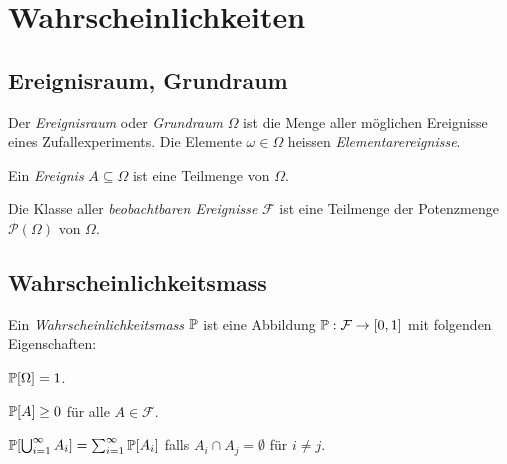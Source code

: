 
\section{Wahrscheinlichkeiten}


\subsection{Ereignisraum, Grundraum}

\begin{definition}[Ereignisraum]
	Der \emph{Ereignisraum} oder \emph{Grundraum} \(\Omega\) ist die Menge aller möglichen Ereignisse eines Zufallexperiments. Die Elemente \(\omega \in \Omega\) heissen \emph{Elementarereignisse}.
\end{definition}

\begin{definition}[Ereignis]
	Ein \emph{Ereignis} \(A \subseteq \Omega\) ist eine Teilmenge von \(\Omega\).
\end{definition}

Die Klasse aller \emph{beobachtbaren Ereignisse} \(\mathcal{F}\) ist eine Teilmenge der Potenzmenge \(\mathcal{P}(\Omega)\) von \(\Omega\).




\subsection{Wahrscheinlichkeitsmass}

\begin{definition}[Wahrscheinlichkeitsmass]
	Ein \emph{Wahrscheinlichkeitsmass} \(\P\) ist eine Abbildung \(\P:\mathcal{F} \rightarrow [0,1]\) mit folgenden Eigenschaften:
	\begin{compactenum}[i:]
		\item \(\P[\Omega] = 1\).
		\item \(\P[A] \geq 0\) für alle \(A \in \mathcal{F}\).
		\item \(\P[\bigcup_{i=1}^\infty A_i] = \sum_{i=1}^\infty \P[A_i]\) falls \(A_i \cap A_j = \emptyset\) für \(i \neq j\).
	\end{compactenum}
\end{definition}

